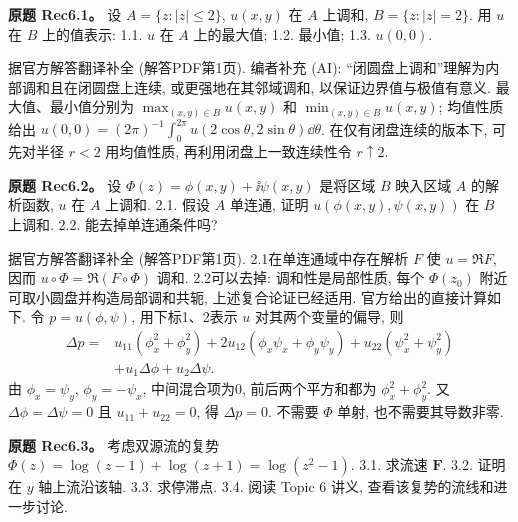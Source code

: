 \begin{exercise}
\textbf{原题 Rec6.1。}\label{ass:rec6-1}
设 $A=\{z:|z|\le2\}$, $u(x,y)$ 在 $A$ 上调和, $B=\{z:|z|=2\}$. 用 $u$ 在 $B$ 上的值表示: 1.1. $u$ 在 $A$ 上的最大值; 1.2. 最小值; 1.3. $u(0,0)$.
\end{exercise}
\begin{solution}
据官方解答翻译补全 (解答PDF第1页). 编者补充 (AI): “闭圆盘上调和”理解为内部调和且在闭圆盘上连续, 或更强地在其邻域调和, 以保证边界值与极值有意义. 最大值、最小值分别为 $\max_{(x,y)\in B}u(x,y)$ 和 $\min_{(x,y)\in B}u(x,y)$; 均值性质给出 $u(0,0)=(2\pi)^{-1}\int_0^{2\pi}u(2\cos\theta,2\sin\theta)\dd\theta$. 在仅有闭盘连续的版本下, 可先对半径 $r<2$ 用均值性质, 再利用闭盘上一致连续性令 $r\uparrow2$.
\end{solution}
\begin{exercise}
\textbf{原题 Rec6.2。}\label{ass:rec6-2}
设 $\Phi(z)=\phi(x,y)+\ii\psi(x,y)$ 是将区域 $B$ 映入区域 $A$ 的解析函数, $u$ 在 $A$ 上调和. 2.1. 假设 $A$ 单连通, 证明 $u(\phi(x,y),\psi(x,y))$ 在 $B$ 上调和. 2.2. 能去掉单连通条件吗?
\end{exercise}
\begin{solution}
据官方解答翻译补全 (解答PDF第1页). 2.1在单连通域中存在解析 $F$ 使 $u=\Re F$, 因而 $u\circ\Phi=\Re(F\circ\Phi)$ 调和. 2.2可以去掉: 调和性是局部性质, 每个 $\Phi(z_0)$ 附近可取小圆盘并构造局部调和共轭, 上述复合论证已经适用. 官方给出的直接计算如下. 令 $p=u(\phi,\psi)$, 用下标1、2表示 $u$ 对其两个变量的偏导, 则
\begin{align*}
\Delta p={}&u_{11}(\phi_x^2+\phi_y^2)+2u_{12}(\phi_x\psi_x+\phi_y\psi_y)
+u_{22}(\psi_x^2+\psi_y^2)\\
&+u_1\Delta\phi+u_2\Delta\psi.
\end{align*}
由 $\phi_x=\psi_y$, $\phi_y=-\psi_x$, 中间混合项为0, 前后两个平方和都为 $\phi_x^2+\phi_y^2$. 又 $\Delta\phi=\Delta\psi=0$ 且 $u_{11}+u_{22}=0$, 得 $\Delta p=0$. 不需要 $\Phi$ 单射, 也不需要其导数非零.
\end{solution}
\begin{exercise}
\textbf{原题 Rec6.3。}\label{ass:rec6-3}
考虑双源流的复势 $\Phi(z)=\log(z-1)+\log(z+1)=\log(z^2-1)$. 3.1. 求流速 $\mathbf F$. 3.2. 证明在 $y$ 轴上流沿该轴. 3.3. 求停滞点. 3.4. 阅读 Topic 6 讲义, 查看该复势的流线和进一步讨论.
\end{exercise}

